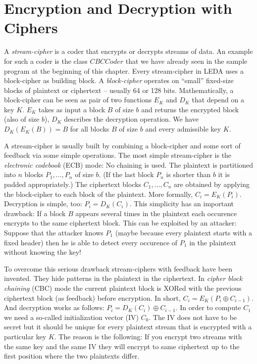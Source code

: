 \newpage


\newpage
\section{Encryption and Decryption with Ciphers}
\label{stream-ciphers}\label{block-ciphers}

A \emph{stream-cipher} is a coder that encrypts or decrypts streams of data.
An example for such a coder is the class $\mathit{CBCCoder}$ that we have
already seen in the sample program at the beginning of this chapter.
Every stream-cipher in LEDA uses a block-cipher as building block.
A \emph{block-cipher} operates on ``small'' fixed-size blocks of plaintext or 
ciphertext -- usually 64 or 128 bits.
Mathematically, a block-cipher can be seen as pair of two functions $E_K$ and
$D_K$ that depend on a key $K$. $E_K$ takes as input a block $B$ of size $b$
and returns the encrypted block (also of size $b$), $D_K$ describes the
decryption operation. We have $D_K(E_K(B)) = B$ for all blocks $B$ of size $b$ 
and every admissible key $K$.

A stream-cipher is usually built by combining a block-cipher and some sort of
feedback via some simple operations. 
The most simple stream-cipher is the \emph{electronic codebook} (ECB)
mode: No chaining is used. The plaintext is partitioned into $n$ blocks $P_1,
\dots, P_n$ of size $b$. (If the last block $P_n$ is shorter than $b$ it is
padded appropriately.)
The ciphertext blocks $C_1, \dots, C_n$ are obtained by applying the 
block-cipher to each block of the plaintext. 
More formally, $C_i = E_K(P_i)$. Decryption is simple, too: $P_i = D_K(C_i)$.
This simplicity has an important drawback: If a block $B$ appears several times
in the plaintext each occurence encrypts to the same ciphertext block. This
can be exploited by an attacker: Suppose that the attacker knows $P_1$ (maybe
because every plaintext starts with a fixed header) then he is able to detect 
every occurence of $P_1$ in the plaintext without knowing the key!

To overcome this serious drawback stream-ciphers with feedback have been
invented. They hide patterns in the plaintext in the ciphertext. 
In \emph{cipher block chaining} (CBC) mode the current plaintext block is
XORed with the previous ciphertext block (as feedback) before encryption.
In short, $C_i = E_K(P_i \oplus C_{i-1})$. And decryption works as follows: 
$P_i = D_K(C_i) \oplus C_{i-1}$. In order to compute $C_1$ we need a so-called
initialization vector (IV) $C_0$. The IV does not have to be secret but it
should be unique for every plaintext stream that is encrypted with a particular
key $K$. The reason is the following: If you encrypt two streams with the same
key and the same IV they will encrypt to same ciphertext up to the first
position where the two plaintexts differ. 

